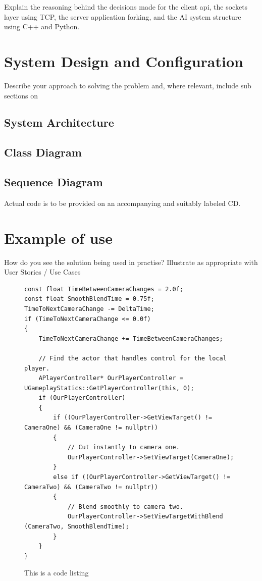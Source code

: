 \documentclass[12pt,a4paper,titlepage]{article}
\begin{document}
Explain the reasoning behind the decisions made for the client api, the sockets layer using TCP, the server application forking, and the AI system structure using C++ and Python.

\section{System Design and Configuration}
Describe your approach to solving the problem and, where relevant, include sub sections on

\subsection{System Architecture}

\subsection{Class Diagram}

\subsection{Sequence Diagram}

Actual code is to be provided on an accompanying and suitably labeled CD.

\section{Example of use}
How do you see the solution being used in practise? Illustrate as appropriate with User Stories / Use Cases 

\begin{figure}[H]
\begin{lstlisting}
const float TimeBetweenCameraChanges = 2.0f;
const float SmoothBlendTime = 0.75f;
TimeToNextCameraChange -= DeltaTime;
if (TimeToNextCameraChange <= 0.0f)
{
    TimeToNextCameraChange += TimeBetweenCameraChanges;

    // Find the actor that handles control for the local player.
    APlayerController* OurPlayerController = UGameplayStatics::GetPlayerController(this, 0);
    if (OurPlayerController)
    {
        if ((OurPlayerController->GetViewTarget() != CameraOne) && (CameraOne != nullptr))
        {
            // Cut instantly to camera one.
            OurPlayerController->SetViewTarget(CameraOne);
        }
        else if ((OurPlayerController->GetViewTarget() != CameraTwo) && (CameraTwo != nullptr))
        {
            // Blend smoothly to camera two.
            OurPlayerController->SetViewTargetWithBlend (CameraTwo, SmoothBlendTime);
        }
    }
}
\end{lstlisting}
	\caption{This is a code listing}
	\label{code:raig header file}
\end{figure}
\end{document}
